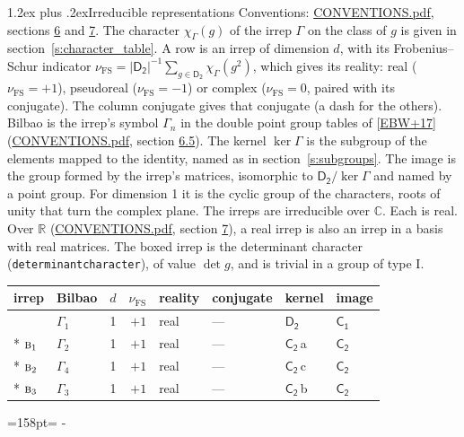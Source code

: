 \documentclass[10pt,a4paper]{article}
\makeatletter
\renewcommand\section{\@startsection{section}{1}{\z@}{-3ex plus -1ex minus -.2ex}%
  {1.2ex plus .2ex}{\normalfont\large\sffamily\bfseries\color{parttitle}}}
\newcommand{\needspace}[1]{\par\penalty-100\begingroup\dimen0=#1\relax\dimen2=\pagegoal
  \advance\dimen2-\pagetotal\ifdim\dimen0>\dimen2\relax\ifdim\dimen2>0pt\vfil\break\fi\fi
  \endgroup}
\numberwithin{equation}{section}
\newcommand{\grp}[1]{\mathsf{#1}}
\newcommand{\irr}[1]{\text{\normalfont\scshape #1}}
\newcommand{\detbox}[1]{{\setlength{\fboxsep}{1pt}\fbox{#1}}}
\newcommand{\clsletter}[1]{\,{\scriptsize\color{black!55}#1}}
\newcommand{\irchar}[1]{\chi_{#1}}
\newcommand{\fsind}{\nu_{\mathrm{FS}}}
\makeatother
\begin{document}
\section{Irreducible representations}\label{s:irreps}
Conventions: \href{../../CONVENTIONS.pdf}{CONVENTIONS.pdf}, sections \href{../../CONVENTIONS.pdf\#conv.6}{6} and \href{../../CONVENTIONS.pdf\#conv.7}{7}.
\leavevmode\label{n:function.character}\label{n:irrep.Gamma}The character $\irchar{\Gamma}(g)$ of the irrep $\Gamma$ on the class of $g$ is given in section~\ref{s:character_table}.
\leavevmode\label{n:index.dimension}\label{n:index.frobenius}\label{n:head.irrep}\label{n:head.reality}A row is an irrep of dimension $d$, with its Frobenius--Schur indicator $\fsind = |\grp{D_{2}}|^{-1}\allowbreak\sum_{g\in\grp{D_{2}}}\irchar{\Gamma}(g^2)$, which gives its reality: real ($\fsind = +1$), pseudoreal ($\fsind = -1$) or complex ($\fsind = 0$, paired with its conjugate). \label{n:head.conjugate}The column conjugate gives that conjugate (a dash for the others). \label{n:head.bilbao}\label{n:irrep.alias.gamma}Bilbao is the irrep's symbol $\Gamma_n$ in the double point group tables of [\href{../../../REFERENCES.pdf\#ref.EBW+17}{EBW+17}] (\href{../../CONVENTIONS.pdf}{CONVENTIONS.pdf}, section \href{../../CONVENTIONS.pdf\#conv.6.5}{6.5}). \label{n:head.kernel}The kernel $\ker\Gamma$ is the subgroup of the elements mapped to the identity, named as in section~\ref{s:subgroups}. \label{n:head.image}The image is the group formed by the irrep's matrices, isomorphic to $\grp{D_{2}}/\ker\Gamma$ and named by a point group. For dimension 1 it is the cyclic group of the characters, roots of unity that turn the complex plane. The irreps are irreducible over $\mathbb{C}$. Each is real. Over $\mathbb{R}$ (\href{../../CONVENTIONS.pdf}{CONVENTIONS.pdf}, section \href{../../CONVENTIONS.pdf\#conv.7}{7}), a real irrep is also an irrep in a basis with real matrices. \label{n:mark.determinant}The boxed irrep is the determinant character (\texttt{determinantcharacter}), of value $\det g$, and is trivial in a group of type I.
\setlength{\emergencystretch}{2em}\par\setlength{\emergencystretch}{0pt}
{\small\renewcommand{\arraystretch}{1.25}\begin{longtable}{@{}llrrllll@{}}\toprule
irrep & Bilbao & $d$ & $\fsind$ & reality & conjugate & kernel & image\\\midrule\endhead
\bottomrule\endfoot\endlastfoot
\detbox{$\irr{a}$} & $\Gamma_{1}$ & 1 & $+1$ & real & --- & \href{D2.pdf}{$\grp{D_{2}}$} & \href{C1.pdf}{$\grp{C_{1}}$}\\*
$\irr{b}_{1}$ & $\Gamma_{2}$ & 1 & $+1$ & real & --- & \href{C2.pdf}{$\grp{C_{2}}$}\clsletter{a} & \href{C2.pdf}{$\grp{C_{2}}$}\\*
$\irr{b}_{2}$ & $\Gamma_{4}$ & 1 & $+1$ & real & --- & \href{C2.pdf}{$\grp{C_{2}}$}\clsletter{c} & \href{C2.pdf}{$\grp{C_{2}}$}\\*
$\irr{b}_{3}$ & $\Gamma_{3}$ & 1 & $+1$ & real & --- & \href{C2.pdf}{$\grp{C_{2}}$}\clsletter{b} & \href{C2.pdf}{$\grp{C_{2}}$}\\
\bottomrule\end{longtable}}
\needspace{158pt}
\end{document}
